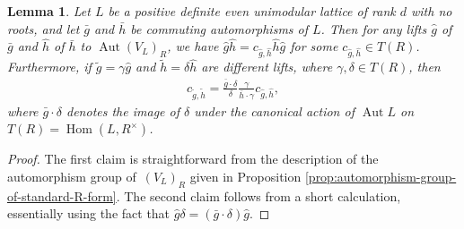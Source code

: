 \documentclass[11pt]{article}
\DeclareMathOperator{\Aut}{Aut}
\DeclareMathOperator{\Hom}{Hom}
\newtheorem{lem}[thm]{Lemma}
\theoremstyle{definition}
\begin{document}
\begin{lem} \label{lem:lifts-of-commuting-pairs}
Let $L$ be a positive definite even unimodular lattice of rank $d$ with no roots, and let $\bar{g}$ and $\bar{h}$ be commuting automorphisms of $L$. Then for any lifts $\hat{g}$ of $\bar{g}$ and $\hat{h}$ of $\bar{h}$ to $\Aut (V_L)_R$, we have $\hat{g}\hat{h} = c_{\hat{g},\hat{h}} \hat{h} \hat{g}$ for some $c_{\hat{g},\hat{h}} \in T(R)$. Furthermore, if $\tilde{g} = \gamma \hat{g}$ and $\tilde{h} = \delta \hat{h}$ are different lifts, where $\gamma, \delta \in T(R)$, then
\begin{gather*} c_{\tilde{g},\tilde{h}} = \frac{\bar{g} \cdot \delta}{\delta} \frac{\gamma}{\bar{h} \cdot \gamma} c_{\hat{g},\hat{h}}, \end{gather*}
where $\bar{g} \cdot \delta$ denotes the image of $\delta$ under the canonical action of $\Aut L$ on $T(R) = \Hom(L, R^\times)$.
\end{lem}
\begin{proof}
The first claim is straightforward from the description of the automorphism group of~$(V_L)_R$ given in Proposition \ref{prop:automorphism-group-of-standard-R-form}. The second claim follows from a short calculation, essentially using the fact that $\hat{g} \delta = (\bar{g} \cdot \delta) \hat{g}$.
\end{proof}
\end{document}
